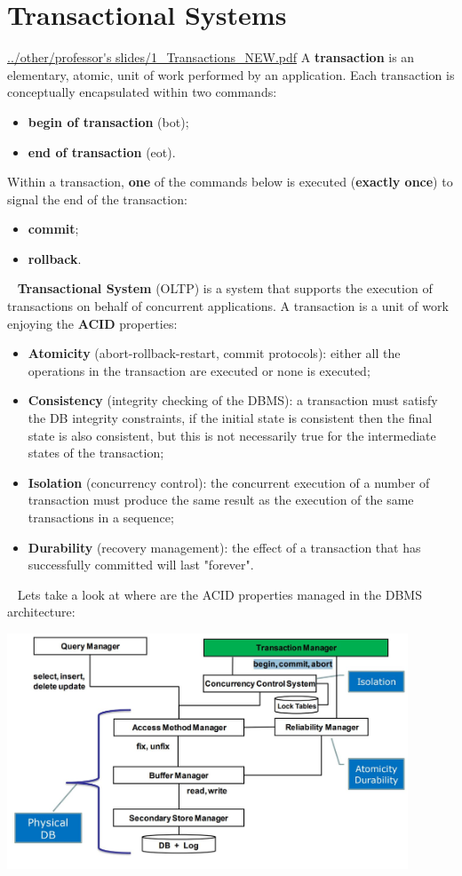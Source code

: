 \section{Transactional Systems}
\url{../other/professor's slides/1_Transactions_NEW.pdf}\newline
\newline
A \textbf{transaction} is an elementary, atomic, unit of work performed by an application.\newline
Each transaction is conceptually encapsulated within two commands:
\begin{itemize}
    \item \textbf{begin of transaction} (bot);
    \item \textbf{end of transaction} (eot).
\end{itemize}
Within a transaction, \textbf{one} of the commands below is executed (\textbf{exactly once}) to signal the end of the transaction:
\begin{itemize}
    \item \textbf{commit};
    \item \textbf{rollback}.
\end{itemize}
\ \newline
\textbf{Transactional System} (OLTP) is a system that supports the execution of transactions on behalf of concurrent applications.\newline
\newline
A transaction is a unit of work enjoying the \textbf{ACID} properties:
\begin{itemize}
    \item \textbf{Atomicity} (abort-rollback-restart, commit protocols): either all the operations in the transaction are executed or none is executed;
    \item \textbf{Consistency} (integrity checking of the DBMS): a transaction must satisfy the DB integrity constraints, if the initial state is consistent then the final state is also consistent, but this is not necessarily true for the intermediate states of the transaction;
    \item \textbf{Isolation} (concurrency control): the concurrent execution of a number of transaction must produce the same result as the execution of the same transactions in a sequence;
    \item \textbf{Durability} (recovery management): the effect of a transaction that has successfully committed will last "forever".
\end{itemize}
\ \newline
Lets take a look at where are the ACID properties managed in the DBMS architecture:
\begin{center}
    \includegraphics[height=7cm]{../arguments/ACIDandDBMSarchitectures.JPG}
\end{center}
